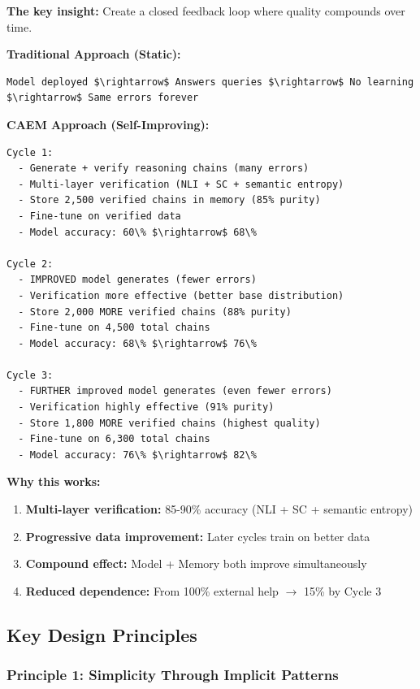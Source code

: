 \documentclass[12pt,a4paper]{article}
\theoremstyle{definition}
\begin{document}
\begin{intuitionbox}
\textbf{The key insight:} Create a closed feedback loop where quality compounds over time.

\textbf{Traditional Approach (Static):}
\begin{verbatim}
Model deployed $\rightarrow$ Answers queries $\rightarrow$ No learning $\rightarrow$ Same errors forever
\end{verbatim}

\textbf{CAEM Approach (Self-Improving):}
\begin{verbatim}
Cycle 1: 
  - Generate + verify reasoning chains (many errors)
  - Multi-layer verification (NLI + SC + semantic entropy)
  - Store 2,500 verified chains in memory (85% purity)
  - Fine-tune on verified data
  - Model accuracy: 60\% $\rightarrow$ 68\%

Cycle 2:
  - IMPROVED model generates (fewer errors)
  - Verification more effective (better base distribution)
  - Store 2,000 MORE verified chains (88% purity)
  - Fine-tune on 4,500 total chains
  - Model accuracy: 68\% $\rightarrow$ 76\%

Cycle 3:
  - FURTHER improved model generates (even fewer errors)
  - Verification highly effective (91% purity)
  - Store 1,800 MORE verified chains (highest quality)
  - Fine-tune on 6,300 total chains
  - Model accuracy: 76\% $\rightarrow$ 82\%
\end{verbatim}

\textbf{Why this works:}
\begin{enumerate}
    \item \textbf{Multi-layer verification:} 85-90\% accuracy (NLI + SC + semantic entropy)
    \item \textbf{Progressive data improvement:} Later cycles train on better data
    \item \textbf{Compound effect:} Model + Memory both improve simultaneously
    \item \textbf{Reduced dependence:} From 100\% external help $\rightarrow$ 15\% by Cycle 3
\end{enumerate}
\end{intuitionbox}

\subsection{Key Design Principles}

\subsubsection{Principle 1: Simplicity Through Implicit Patterns}
\end{document}
